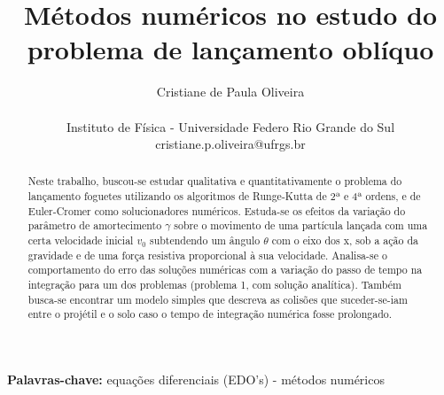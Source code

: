 \documentclass[a4paper, brazilian, 8pt, final]{article}
\title{\textbf{Métodos numéricos no estudo do problema de lançamento oblíquo}}
\author{Cristiane de Paula Oliveira \\\\ \small Instituto de Física - Universidade Federo Rio Grande do Sul \\ \small cristiane.p.oliveira@ufrgs.br}
\begin{document}
\maketitle
\begin{abstract}
Neste trabalho, buscou-se estudar qualitativa e quantitativamente o problema do lançamento foguetes utilizando os algoritmos de Runge-Kutta de 2ª e 4ª ordens, e de Euler-Cromer como solucionadores numéricos. Estuda-se os efeitos da variação do parâmetro de amortecimento $\gamma$ sobre o movimento de uma partícula lançada com uma certa velocidade inicial $v_{0}$ subtendendo um ângulo $\theta$ com o eixo dos x, sob a ação da gravidade e de uma força resistiva proporcional à sua velocidade. Analisa-se o comportamento do erro das soluções numéricas com a variação do passo de tempo na integração para um dos problemas (problema 1, com solução analítica). Também busca-se encontrar um modelo simples que descreva as colisões que suceder-se-iam entre o projétil e o solo caso o tempo de integração numérica fosse prolongado. 
\end{abstract}

\textbf{Palavras-chave:} equações diferenciais (EDO's) - métodos numéricos 
\end{document}
